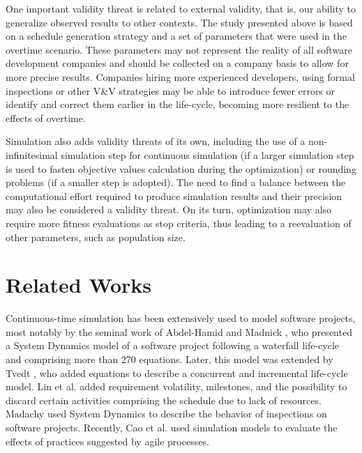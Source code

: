 \documentclass[conference]{IEEEtran}
\begin{document}
One important validity threat is related to external validity, that is, our ability to generalize observed results to other contexts. The study presented above is based on a schedule generation strategy and a set of parameters that were used in the overtime scenario. These parameters may not represent the reality of all software development companies and should be collected on a company basis to allow for more precise results. Companies hiring more experienced developers, using formal inspections or other V\&V strategies may be able to introduce fewer errors or identify and correct them earlier in the life-cycle, becoming more resilient to the effects of overtime.

Simulation also adds validity threats of its own, including the use of a non-infinitesimal simulation step for continuous simulation (if a larger simulation step is used to fasten objective values calculation during the optimization) or rounding problems (if a smaller step is adopted). The need to find a balance between the computational effort required to produce simulation results and their precision may also be considered a validity threat. On its turn, optimization may also require more fitness evaluations as stop criteria, thus leading to a reevaluation of other parameters, such as population size.

\section{Related Works}

Continuous-time simulation has been extensively used to model software projects, most notably by the seminal work of Abdel-Hamid and Madnick \cite{Abdel-Hamid:1991}, who presented a System Dynamics model of a software project following a waterfall life-cycle and comprising more than 270 equations. Later, this model was extended by Tvedt \cite{Tvedt:1996}, who added equations to describe a concurrent and incremental life-cycle model. Lin et al. \cite{Lin:1997} added requirement volatility, milestones, and the possibility to discard certain activities comprising the schedule due to lack of resources. Madachy \cite{Madachy:1996} used System Dynamics to describe the behavior of inspections on software projects. Recently, Cao et al. \cite{Cao:2010} used simulation models to evaluate the effects of practices suggested by agile processes.
\end{document}
